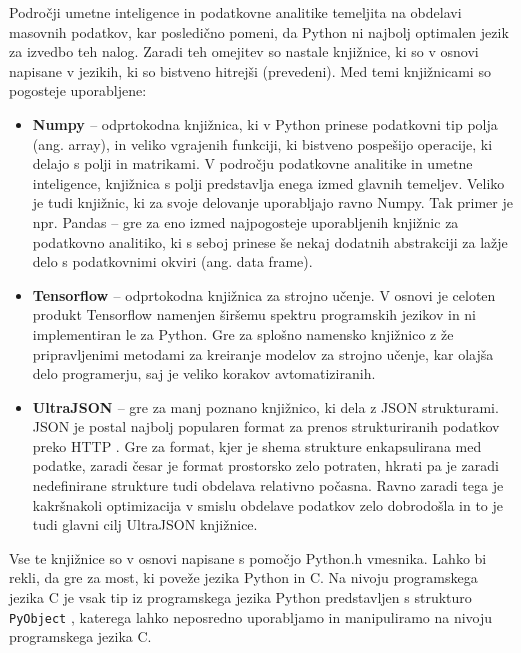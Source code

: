 \documentclass[a4paper,12pt,openright]{book}
\begin{document}
    Področji umetne inteligence in podatkovne analitike temeljita na obdelavi masovnih podatkov, kar posledično pomeni, da Python ni najbolj optimalen jezik za izvedbo teh nalog. Zaradi teh omejitev so nastale knjižnice, ki so v osnovi napisane v jezikih, ki so bistveno hitrejši (prevedeni). Med temi knjižnicami so pogosteje uporabljene:
    \begin{itemize}
        \item \textbf{Numpy \cite{NUMPY_GITHUB}} – odprtokodna knjižnica, ki v Python prinese podatkovni tip polja (ang. array), in veliko vgrajenih funkciji, ki bistveno pospešijo operacije, ki delajo s polji in matrikami. V področju podatkovne analitike in umetne inteligence, knjižnica s polji predstavlja enega izmed glavnih temeljev. Veliko je tudi knjižnic, ki za svoje delovanje uporabljajo ravno Numpy. Tak primer je npr. Pandas \cite{PANDAS_GITHUB} – gre za eno izmed najpogosteje uporabljenih knjižnic za podatkovno analitiko, ki s seboj prinese še nekaj dodatnih abstrakciji za lažje delo s podatkovnimi okviri (ang. data frame).
        \item \textbf{Tensorflow \cite{TENSORFLOW_GITHUB}} –  odprtokodna knjižnica za strojno učenje. V osnovi je celoten produkt Tensorflow namenjen širšemu spektru programskih jezikov in ni implementiran le za Python. Gre za splošno namensko knjižnico z že pripravljenimi metodami za kreiranje modelov za strojno učenje, kar olajša delo programerju, saj je veliko korakov avtomatiziranih.
        \item \textbf{UltraJSON \cite{UJSON_GITHUB}} – gre za manj poznano knjižnico, ki dela z JSON strukturami. JSON je postal najbolj popularen format za prenos strukturiranih podatkov preko HTTP \cite{JSON_ACM}. Gre za format, kjer je shema strukture enkapsulirana med podatke, zaradi česar je format prostorsko zelo potraten, hkrati pa je zaradi nedefinirane strukture tudi obdelava relativno počasna. Ravno zaradi tega je kakršnakoli optimizacija v smislu obdelave podatkov zelo dobrodošla in to je tudi glavni cilj UltraJSON knjižnice.
    \end{itemize}

    \noindent
    Vse te knjižnice so v osnovi napisane s pomočjo Python.h vmesnika. Lahko bi rekli, da gre za most, ki poveže jezika Python in C. Na nivoju programskega jezika C je vsak tip iz programskega jezika Python predstavljen s strukturo {\tt PyObject} \cite{PY_OBJECT}, katerega lahko neposredno uporabljamo in manipuliramo na nivoju programskega jezika C. 
\end{document}
